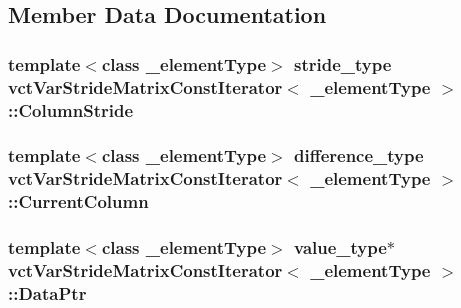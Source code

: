 \subsection{Member Data Documentation}
\hypertarget{classvct_var_stride_matrix_const_iterator_ab98d9434efbc9e7134de2fcec000a3d8}{
\subsubsection[{Column\-Stride}]{\setlength{\rightskip}{0pt plus 5cm}template$<$class \-\_\-element\-Type$>$ stride\-\_\-type {\bf vct\-Var\-Stride\-Matrix\-Const\-Iterator}$<$ \-\_\-element\-Type $>$\-::Column\-Stride\hspace{0.3cm}{\ttfamily [protected]}}}\label{classvct_var_stride_matrix_const_iterator_ab98d9434efbc9e7134de2fcec000a3d8}
\hypertarget{classvct_var_stride_matrix_const_iterator_ab4a96221a2fbcc7005f464c24af72b5b}{
\subsubsection[{Current\-Column}]{\setlength{\rightskip}{0pt plus 5cm}template$<$class \-\_\-element\-Type$>$ difference\-\_\-type {\bf vct\-Var\-Stride\-Matrix\-Const\-Iterator}$<$ \-\_\-element\-Type $>$\-::Current\-Column\hspace{0.3cm}{\ttfamily [protected]}}}\label{classvct_var_stride_matrix_const_iterator_ab4a96221a2fbcc7005f464c24af72b5b}
\hypertarget{classvct_var_stride_matrix_const_iterator_a37082ec0e45ee9d5be0b904b5bc81bb2}{
\subsubsection[{Data\-Ptr}]{\setlength{\rightskip}{0pt plus 5cm}template$<$class \-\_\-element\-Type$>$ value\-\_\-type$\ast$ {\bf vct\-Var\-Stride\-Matrix\-Const\-Iterator}$<$ \-\_\-element\-Type $>$\-::Data\-Ptr\hspace{0.3cm}{\ttfamily [protected]}}}\label{classvct_var_stride_matrix_const_iterator_a37082ec0e45ee9d5be0b904b5bc81bb2}
